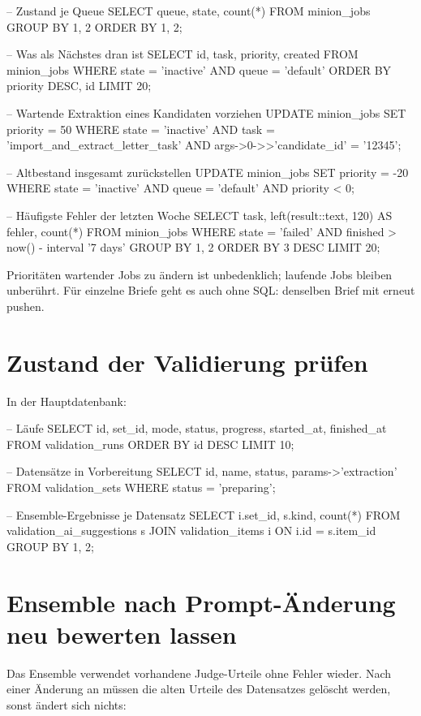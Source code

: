 \documentclass[11pt,a4paper,parskip=half-,headings=standardclasses,toc=bibliography,open=any]{scrreprt}
\begin{document}
\begin{befehl}
-- Zustand je Queue
SELECT queue, state, count(*) FROM minion_jobs GROUP BY 1, 2 ORDER BY 1, 2;

-- Was als Nächstes dran ist
SELECT id, task, priority, created FROM minion_jobs
 WHERE state = 'inactive' AND queue = 'default'
 ORDER BY priority DESC, id LIMIT 20;

-- Wartende Extraktion eines Kandidaten vorziehen
UPDATE minion_jobs SET priority = 50
 WHERE state = 'inactive' AND task = 'import_and_extract_letter_task'
   AND args->0->>'candidate_id' = '12345';

-- Altbestand insgesamt zurückstellen
UPDATE minion_jobs SET priority = -20
 WHERE state = 'inactive' AND queue = 'default' AND priority < 0;

-- Häufigste Fehler der letzten Woche
SELECT task, left(result::text, 120) AS fehler, count(*)
  FROM minion_jobs WHERE state = 'failed' AND finished > now() - interval '7 days'
 GROUP BY 1, 2 ORDER BY 3 DESC LIMIT 20;
\end{befehl}

Prioritäten wartender Jobs zu ändern ist unbedenklich; laufende Jobs bleiben unberührt. Für einzelne Briefe geht es auch ohne SQL: denselben Brief mit  erneut pushen.

\section{Zustand der Validierung prüfen}

In der Hauptdatenbank:

\begin{befehl}
-- Läufe
SELECT id, set_id, mode, status, progress, started_at, finished_at
  FROM validation_runs ORDER BY id DESC LIMIT 10;

-- Datensätze in Vorbereitung
SELECT id, name, status, params->'extraction' FROM validation_sets WHERE status = 'preparing';

-- Ensemble-Ergebnisse je Datensatz
SELECT i.set_id, s.kind, count(*) FROM validation_ai_suggestions s
  JOIN validation_items i ON i.id = s.item_id GROUP BY 1, 2;
\end{befehl}

\section{Ensemble nach Prompt-Änderung neu bewerten lassen}

Das Ensemble verwendet vorhandene Judge-Urteile ohne Fehler wieder. Nach einer Änderung an  müssen die alten Urteile des Datensatzes gelöscht werden, sonst ändert sich nichts:
\end{document}
